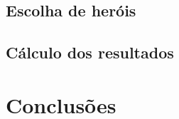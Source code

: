 \documentclass[a4paper]{article}
\begin{document}
\hspace{3mm} 

\subsection{Escolha de heróis}

\hspace{3mm} 

\subsection{Cálculo dos resultados}

\hspace{3mm} 

\pagebreak


\section{Conclusões}
\label{sec:4}

\hspace{3mm} 
\end{document}
